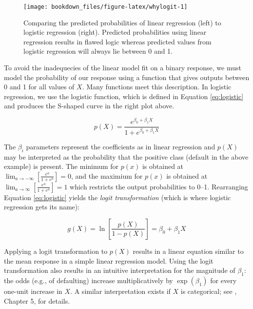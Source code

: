 \documentclass[]{krantz}
\begin{document}
\begin{figure}

{\centering \texttt{[image: bookdown\_files/figure-latex/whylogit-1]} 

}

\caption{Comparing the predicted probabilities of linear regression (left) to logistic regression (right). Predicted probabilities using linear regression results in flawed logic whereas predicted values from logistic regression will always lie between 0 and 1.}\label{fig:whylogit}
\end{figure}

To avoid the inadequecies of the linear model fit on a binary response, we must model the probability of our response using a function that gives outputs between 0 and 1 for all values of \(X\). Many functions meet this description. In logistic regression, we use the logistic function, which is defined in Equation \eqref{eq:logistic} and produces the S-shaped curve in the right plot above.

\begin{equation}
\label{eq:logistic}
  p\left(X\right) = \frac{e^{\beta_0 + \beta_1X}}{1 + e^{\beta_0 + \beta_1X}}
\end{equation}

The \(\beta_i\) parameters represent the coefficients as in linear regression and \(p\left(X\right)\) may be interpreted as the probability that the positive class (default in the above example) is present. The minimum for \(p\left(x\right)\) is obtained at \(\lim_{a \rightarrow -\infty} \left[ \frac{e^a}{1+e^a} \right] = 0\), and the maximium for \(p\left(x\right)\) is obtained at \(\lim_{a \rightarrow \infty} \left[ \frac{e^a}{1+e^a} \right] = 1\) which restricts the output probabilities to 0--1. Rearranging Equation \eqref{eq:logistic} yields the \emph{logit transformation} (which is where logistic regression gets its name):

\begin{equation}
\label{eq:logit}
  g\left(X\right) = \ln \left[ \frac{p\left(X\right)}{1 - p\left(X\right)} \right] = \beta_0 + \beta_1 X
\end{equation}

Applying a logit transformation to \(p\left(X\right)\) results in a linear equation similar to the mean response in a simple linear regression model. Using the logit transformation also results in an intuitive interpretation for the magnitude of \(\beta_1\): the odds (e.g., of defaulting) increase multiplicatively by \(\exp\left(\beta_1\right)\) for every one-unit increase in \(X\). A similar interpretation exists if \(X\) is categorical; see \citet{agresti2003categorical}, Chapter 5, for details.
\end{document}
